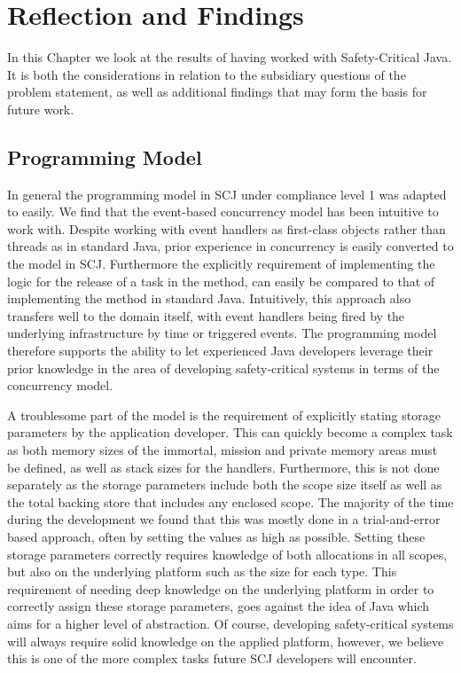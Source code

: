 \chapter{Reflection and Findings}
\label{chapter:Reflection}
In this Chapter we look at the results of having worked with Safety-Critical Java. It is both the considerations in relation to the subsidiary questions of the problem statement, as well as additional findings that may form the basis for future work.

\section{Programming Model} 
\label{sec:programming_model}
In general the programming model in SCJ under compliance level 1 was adapted to easily. We find that the event-based concurrency model has been intuitive to work with. Despite working with event handlers as first-class objects rather than threads as in standard Java, prior experience in concurrency is easily converted to the model in SCJ. Furthermore the explicitly requirement of implementing the logic for the release of a task in the  method, can easily be compared to that of implementing the  method in standard Java. Intuitively, this approach also transfers well to the domain itself, with event handlers being fired by the underlying infrastructure by time or triggered events. The programming model therefore supports the ability to let experienced Java developers leverage their prior knowledge in the area of developing safety-critical systems in terms of the concurrency model.

A troublesome part of the model is the requirement of explicitly stating storage parameters by the application developer. This can quickly become a complex task as both memory sizes of the immortal, mission and private memory areas must be defined, as well as stack sizes for the handlers. Furthermore, this is not done separately as the storage parameters include both the scope size itself as well as the total backing store that includes any enclosed scope. The majority of the time during the development we found that this was mostly done in a trial-and-error based approach, often by setting the values as high as possible. Setting these storage parameters correctly requires knowledge of both allocations in all scopes, but also on the underlying platform such as the size for each type. This requirement of needing deep knowledge on the underlying platform in order to correctly assign these storage parameters, goes against the idea of Java which aims for a higher level of abstraction. Of course, developing safety-critical systems will always require solid knowledge on the applied platform, however, we believe this is one of the more complex tasks future SCJ developers will encounter.

